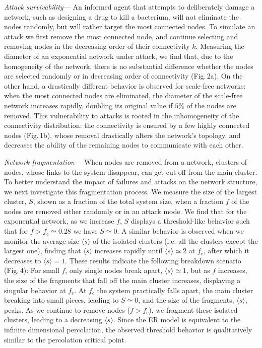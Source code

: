 {\it Attack survivability---} An informed agent that attempts to deliberately damage a network, such as designing a drug to kill a bacterium, will not eliminate the nodes randomly, but will rather target the most connected nodes. To simulate an attack we first remove the most connected node, and continue selecting and removing nodes in the decreasing order of their connectivity $k$. Measuring the diameter of an exponential network under attack, we find that, due to the homogeneity of the network, there is no substantial difference whether the nodes are selected randomly or in decreasing order of connectivity (Fig.$\,$2a). On the other hand, a drastically different behavior is observed for scale-free networks: when the most connected nodes are eliminated, the diameter of the scale-free network increases rapidly, doubling its original value if $5\%$ of the nodes are removed. This vulnerability to attacks is rooted in the inhomogeneity of the connectivity distribution: the connectivity is ensured by a few highly connected nodes (Fig.$\,$1b), whose removal drastically alters the network's topology, and decreases the ability of the remaining nodes to communicate with each other.

{\it Network fragmentation---} When nodes are removed from a network, clusters of nodes, whose links to the system disappear, can get cut off from the main cluster. To better understand the impact of failures and attacks on the network structure, we next investigate this fragmentation process. We measure the size of the largest cluster, $S$, shown as a fraction of the total system size, when a fraction $f$ of the nodes are removed either randomly or in an attack mode. We find that for the exponential network, as we increase $f$, $S$ displays a threshold-like behavior such that for $f>f_c\simeq 0.28$ we have $S\simeq 0$. A similar behavior is observed when we monitor the average size $\langle s\rangle$ of the isolated clusters (i.e. all the clusters except the largest one), finding that $\langle s\rangle$ increases rapidly until $\langle s\rangle\simeq 2$ at $f_c$, after which it decreases to $\langle s\rangle=1$. These results indicate the following breakdown scenario (Fig.$\,$4): For small $f$, only single nodes break apart, $\langle s\rangle\simeq 1$, but as $f$ increases, the size of the fragments that fall off the main cluster increases,  displaying a singular behavior at $f_c$. At $f_c$ the system practically falls apart, the main cluster breaking into small pieces, leading to $S\simeq 0$, and the size of the fragments, $\langle s\rangle$, peaks. As we continue to remove nodes ($f>f_c$), we fragment these isolated clusters, leading to a decreasing $\langle s \rangle$. Since the ER model is equivalent to the infinite dimensional percolation\cite{perc}, the observed threshold behavior is qualitatively similar to the percolation critical point.

